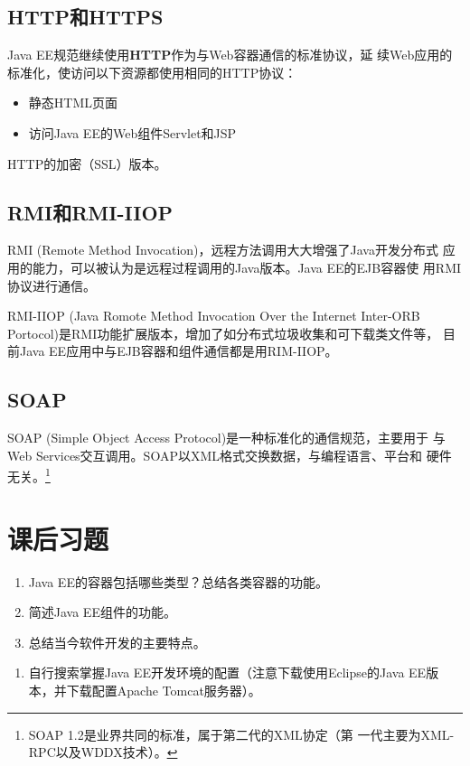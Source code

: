\subsection{HTTP和HTTPS} 


Java EE规范继续使用{\bf\Red HTTP}作为与Web容器通信的标准协议，延
续Web应用的标准化，使访问以下资源都使用相同的HTTP协议：

\begin{itemize}\kai
\item 静态HTML页面
\item 访问Java EE的Web组件Servlet和JSP
\end{itemize}


HTTP的加密（SSL）版本。


\subsection{RMI和RMI-IIOP} 


RMI (Remote Method Invocation)，远程方法调用大大增强了Java开发分布式
应用的能力，可以被认为是远程过程调用的Java版本。Java EE的EJB容器使
用RMI协议进行通信。


RMI-IIOP (Java Romote Method Invocation Over the Internet Inter-ORB
Portocol)是RMI功能扩展版本，增加了如分布式垃圾收集和可下载类文件等，
目前Java EE应用中与EJB容器和组件通信都是用RIM-IIOP。

\subsection{SOAP} 

SOAP (Simple Object Access Protocol)是一种标准化的通信规范，主要用于
与Web Services交互调用。SOAP以XML格式交换数据，与编程语言、平台和
硬件无关。\footnote{SOAP 1.2是业界共同的标准，属于第二代的XML协定（第
  一代主要为XML-RPC以及WDDX技术）。}


\section{课后习题}


\begin{enumerate}
\item Java EE的容器包括哪些类型？总结各类容器的功能。
\item 简述Java EE组件的功能。
\item 总结当今软件开发的主要特点。
\end{enumerate}


\begin{enumerate}
\item 自行搜索掌握Java EE开发环境的配置（注意下载使用Eclipse的Java EE版本，并下载配置Apache Tomcat服务器）。
\end{enumerate}